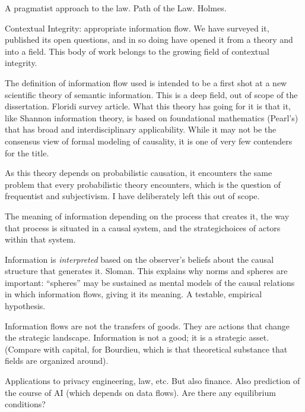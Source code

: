 \documentclass[../thesis.tex]{subfiles}
\begin{document}
 A pragmatist approach to the law. Path of the Law. Holmes.

 Contextual Integrity: appropriate information flow. We have surveyed it, published its open questions, and in so doing have opened it from a theory and into a field. This body of work belongs to the growing field of contextual integrity.

 The definition of information flow used is intended to be a first shot at a new scientific theory of semantic information. This is a deep field, out of scope of the dissertation. Floridi survey article. What this theory has going for it is that it, like Shannon information theory, is based on foundational mathematics (Pearl's) that has broad and interdisciplinary applicability. While it may not be the consensus view of formal modeling of causality, it is one of very few contenders for the title.

 As this theory depends on probabilistic causation, it encounters the same problem that every probabilistic theory encounters, which is the question of frequentist and subjectivism. I have deliberately left this out of scope.

 The meaning of information depending on the process that creates it, the way that process is situated in a causal system, and the strategichoices of actors within that system.

Information is \textit{interpreted} based on the observer's beliefs about the causal structure that generates it. Sloman. This explains why norms and spheres are important: ``spheres'' may be sustained as mental models of the causal relations in which information flows, giving it its meaning. A testable, empirical hypothesis.

 
Information flows are not the transfers of goods. They are actions that change the strategic landscape. Information is not a good; it is a strategic asset. (Compare with capital, for Bourdieu, which is that theoretical substance that fields are organized around).

Applications to privacy engineering, law, etc. But also finance. Also prediction of the course of AI (which depends on data flows). Are there any equilibrium conditions?
 
\end{document}
